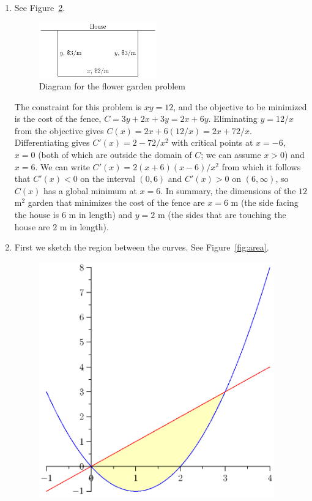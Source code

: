 \documentclass{article}
\begin{document}
\begin{enumerate}
\begin{enumerate}
\begin{figure}[htbp]
      \caption{The graph of $f(x)=x^3+3x^2-9x-2$}
      \label{fig:sketch}
    \end{figure}
    Your graph should look something like the graph in Figure~\ref{fig:sketch}.
  \end{enumerate}
\item See Figure~\ref{fig:flower}.
  \begin{figure}[htbp]
    \begin{center}
      \includegraphics[width=2in]{flower.eps}
    \end{center}
    \caption{Diagram for the flower garden problem}
    \label{fig:flower}
  \end{figure}
  The constraint for this problem is $xy=12$, and the objective to be
  minimized is the cost of the fence, $C=3y+2x+3y=2x+6y$.  Eliminating
  $y=12/x$ from the objective gives $C(x)=2x+6(12/x)=2x+72/x$.  Differentiating
  gives $C'(x)=2-72/x^2$ with critical points at $x=-6$, $x=0$ (both of which
  are outside the domain of $C$; we can assume $x>0$) and $x=6$.  We
  can write $C'(x)=2(x+6)(x-6)/x^2$ from which it follows that $C'(x)<0$ on
  the interval $(0,6)$ and $C'(x)>0$ on $(6,\infty)$, so $C(x)$ has a global
  minimum at $x=6$.  In summary, the dimensions of the $12$ m$^2$
  garden that minimizes the cost of the fence are $x=6$ m (the side facing
  the house is $6$ m in length) and $y=2$ m 
  (the sides that are touching the house are $2$ m in length).
\item First we sketch the region between the curves.  See Figure~\ref{fig:area}.
  \begin{figure}[htbp]
    \begin{center}
      \includegraphics[width=4in]{area.eps}

\end{center}
\end{figure}
\end{enumerate}
\end{document}
